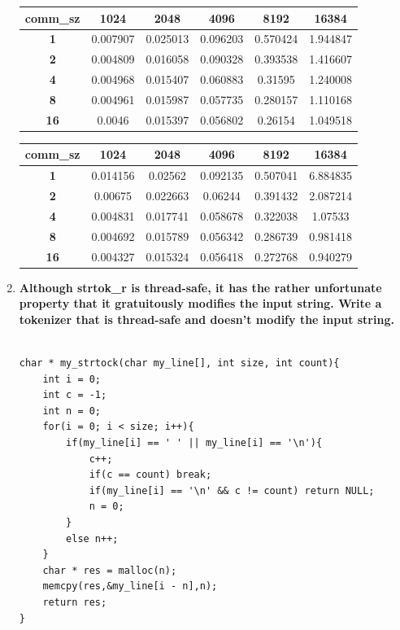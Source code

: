 \documentclass[a4paper,12pt]{article}
\begin{document}
\begin{enumerate}
\begin{center}
\begin{tabular}{|c|c|c|c|c|c|}\hline
\textbf{comm\_sz} & \textbf{1024} & \textbf{2048} & \textbf{4096} & \textbf{8192} & \textbf{16384}\\\hline
\textbf{1} & 0.007907 & 0.025013 & 0.096203 & 0.570424 & 1.944847\\\hline
\textbf{2} & 0.004809 & 0.016058 & 0.090328 & 0.393538 & 1.416607\\\hline
\textbf{4} & 0.004968 & 0.015407 & 0.060883 & 0.31595 & 1.240008\\\hline
\textbf{8} & 0.004961 & 0.015987 & 0.057735 & 0.280157 & 1.110168\\\hline
\textbf{16} & 0.0046 & 0.015397 & 0.056802 & 0.26154 & 1.049518\\\hline
\end{tabular}
\end{center}


\begin{center}
\begin{tabular}{|c|c|c|c|c|c|}\hline
\textbf{comm\_sz} & \textbf{1024} & \textbf{2048} & \textbf{4096} & \textbf{8192} & \textbf{16384}\\\hline
\textbf{1} & 0.014156 & 0.02562 & 0.092135 & 0.507041 & 6.884835\\\hline
\textbf{2} & 0.00675 & 0.022663 & 0.06244 & 0.391432 & 2.087214\\\hline
\textbf{4} & 0.004831 & 0.017741 & 0.058678 & 0.322038 & 1.07533\\\hline
\textbf{8} & 0.004692 & 0.015789 & 0.056342 & 0.286739 & 0.981418\\\hline
\textbf{16} & 0.004327 & 0.015324 & 0.056418 & 0.272768 & 0.940279\\\hline
\end{tabular}
\end{center}



\item \textbf{Although strtok\_r is thread-safe, it has the rather unfortunate property that it gratuitously modifies the
input string. Write a tokenizer that is thread-safe and doesn’t modify the input string.}

\begin{lstlisting}

char * my_strtock(char my_line[], int size, int count){
	int i = 0;
	int c = -1;
	int n = 0;
	for(i = 0; i < size; i++){
		if(my_line[i] == ' ' || my_line[i] == '\n'){
			c++;
			if(c == count) break;
			if(my_line[i] == '\n' && c != count) return NULL;
			n = 0;
		} 
		else n++;
	}
	char * res = malloc(n);
	memcpy(res,&my_line[i - n],n);
	return res;
}
\end{lstlisting}


\end{enumerate}
\end{document}
